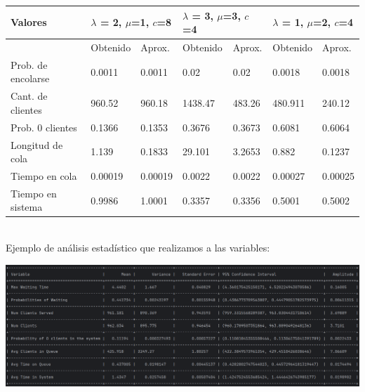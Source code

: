 \documentclass[11pt]{article}
\begin{document}
    \begin{table}[h]
\begin{tabular}{|l|ll|ll|ll|}
\hline
Valores                                  & \multicolumn{2}{l|}{$\lambda$ = 2, $\mu$=1, $c$=8}      & \multicolumn{2}{l|}{$\lambda$ = 3, $\mu$=3, $c$=4}       & \multicolumn{2}{l|}{$\lambda$ = 1, $\mu$=2, $c$=4}      \\ \hline
                                         & \multicolumn{1}{l|}{Obtenido} & Aprox. & \multicolumn{1}{l|}{Obtenido} & Aprox. & \multicolumn{1}{l|}{Obtenido} & Aprox. \\ \hline
Prob. de encolarse                       & 0.0011                                  & 0.0011       & 0.02                                    & 0.02         & 0.0018                                  & 0.0018       \\ \cline{1-1}
Cant. de clientes                     & 960.52                                  & 960.18       & 1438.47                                 & 483.26       & 480.911                                 & 240.12       \\ \cline{1-1}
Prob. 0 clientes                         & 0.1366                                  & 0.1353       & 0.3676                                  & 0.3673       & 0.6081                                  & 0.6064       \\ \cline{1-1}
Longitud de cola                & 1.139                                   & 0.1833       & 29.101                                  & 3.2653       & 0.882                                   & 0.1237       \\ \cline{1-1}
Tiempo en cola                  & 0.00019                                 & 0.00019      & 0.0022                                  & 0.0022       & 0.00027                                 & 0.00025      \\ \cline{1-1}
Tiempo en sistema               & 0.9986                                  & 1.0001       & 0.3357                                  & 0.3356       & 0.5001                                  & 0.5002       \\ \hline
\end{tabular}
\end{table} \\[20pt]

    Ejemplo de análisis estadístico que realizamos a las variables:

    \includegraphics[width=1\textwidth]{images/8} \\
\end{document}
